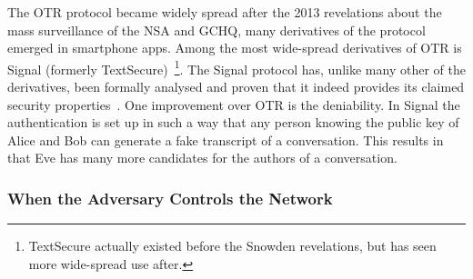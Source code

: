 The \ac{OTR} protocol became widely spread after the 2013 revelations about the
mass surveillance of the \ac{NSA} and \ac{GCHQ}, many derivatives of the 
protocol emerged in smartphone apps.
Among the most wide-spread derivatives of \ac{OTR} is Signal (formerly 
TextSecure)~\cite{SignalApp}\footnote{%
  TextSecure actually existed before the Snowden revelations, but has seen more
  wide-spread use after.
}.
The Signal protocol has, unlike many other of the derivatives, been formally 
analysed and proven that it indeed provides its claimed security 
properties~\cite{TextSecureAnalysis}.
One improvement over \ac{OTR} is the deniability.
In Signal the authentication is set up in such a way that any person knowing 
the public key of Alice and Bob can generate a fake transcript of 
a conversation.
This results in that Eve has many more candidates for the authors of 
a conversation.

\subsubsection{When the Adversary Controls the Network}


